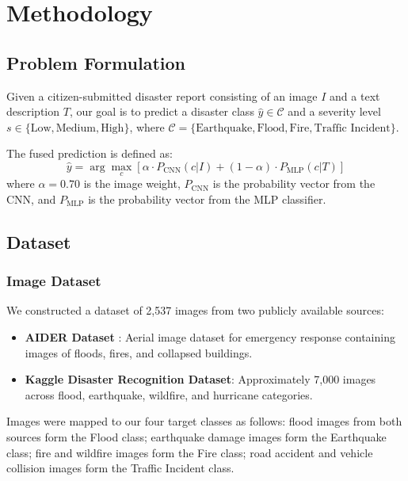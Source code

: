 \documentclass[conference]{IEEEtran}
\begin{document}
\section{Methodology}
\label{sec:methodology}

\subsection{Problem Formulation}

Given a citizen-submitted disaster report consisting of an image $I$ and a text description $T$, our goal is to predict a disaster class $\hat{y} \in \mathcal{C}$ and a severity level $s \in \{\text{Low}, \text{Medium}, \text{High}\}$, where $\mathcal{C} = \{\text{Earthquake}, \text{Flood}, \text{Fire}, \text{Traffic Incident}\}$.

The fused prediction is defined as:
\begin{equation}
\hat{y} = \arg\max_c \left[ \alpha \cdot P_{\text{CNN}}(c | I) + (1-\alpha) \cdot P_{\text{MLP}}(c | T) \right]
\label{eq:fusion}
\end{equation}
where $\alpha = 0.70$ is the image weight, $P_{\text{CNN}}$ is the probability vector from the CNN, and $P_{\text{MLP}}$ is the probability vector from the MLP classifier.

\subsection{Dataset}

\subsubsection{Image Dataset}

We constructed a dataset of 2,537 images from two publicly available sources:

\begin{itemize}
    \item \textbf{AIDER Dataset} \cite{kyrkou2019aider}: Aerial image dataset for emergency response containing images of floods, fires, and collapsed buildings.
    \item \textbf{Kaggle Disaster Recognition Dataset}: Approximately 7,000 images across flood, earthquake, wildfire, and hurricane categories.
\end{itemize}

Images were mapped to our four target classes as follows: flood images from both sources form the Flood class; earthquake damage images form the Earthquake class; fire and wildfire images form the Fire class; road accident and vehicle collision images form the Traffic Incident class.
\end{document}
